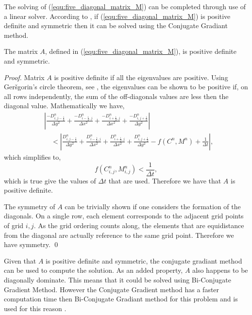 \documentclass{llncs}
\begin{document}
  The solving of (\ref{equ:five_diagonal_matrix_M}) can be completed through use of a linear solver. 
  According to \cite{barret1987templates}, if (\ref{equ:five_diagonal_matrix_M}) is positive definite and symmetric then it can be solved using the Conjugate Gradiant method.
  \begin{proposition}
    The matrix $A$, defined in (\ref{equ:five_diagonal_matrix_M}), is positive definite and symmetric.
  \end{proposition}
  \begin{proof}
    Matrix $A$ is positive definite if all the eigenvalues are positive. 
    Using Ger{\v s}gorin's circle theorem, see \cite{gerschgorin1931uber_die_abgrenzung}, the eigenvalues can be shown to be positive if, on all rows independently, the sum of the off-diagonals values are less then the diagonal value.
    Mathematically we have,
    \begin{equation}
      \begin{aligned}
      & \left| \frac{-D^n_{i,j-\frac{1}{2}}}{\Delta y ^2} + \frac{-D^n_{i-\frac{1}{2},j}}{\Delta x ^2} + \frac{-D^n_{i+\frac{1}{2},j}}{\Delta x ^2} + \frac{-D^n_{i,j+\frac{1}{2}}}{\Delta y ^2} \right| \\
      &\quad < \left| \frac{D^n_{i,j-\frac{1}{2}}}{\Delta y ^2} + \frac{D^n_{i-\frac{1}{2},j}}{\Delta x ^2} + \frac{D^n_{i+\frac{1}{2},j}}{\Delta x ^2} + \frac{D^n_{i,j+\frac{1}{2}}}{\Delta y ^2} - f(C^n, M^n) + \frac{1}{\Delta t} \right|, 
      \end{aligned}
    \end{equation}
    which simplifies to,
    \begin{equation}
      f(C^n_{i,j}, M^n_{i,j}) < \frac{1}{\Delta t},
    \end{equation}
    which is true give the values of $\Delta t$ that are used. Therefore we have that $A$ is positive definite.

    The symmetry of $A$ can be trivially shown if one considers the formation of the diagonals.
    On a single row, each element corresponds to the adjacent grid points of grid $i,j$.
    As the grid ordering counts along, the elements that are equidistance from the diagonal are actually reference to the same grid point. 
    Therefore we have symmetry. \qed
  \end{proof} 

  Given that $A$ is positive definite and symmetric, the conjugate gradiant method can be used to compute the solution.
  As an added property, $A$ also happens to be diagonally dominate.
  This means that it could be solved using Bi-Conjugate Gradient Method.
  However the Conjugate Gradient method has a faster computation time then Bi-Conjugate Gradiant method for this problem and is used for this reason \cite{barret1987templates}.
\end{document}
